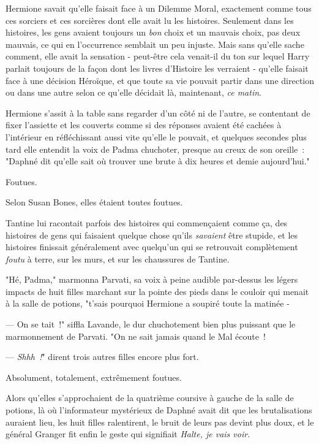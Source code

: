 Hermione savait qu'elle faisait face à un Dilemme Moral, exactement comme tous ces sorciers et ces sorcières dont elle avait lu les histoires. Seulement dans les histoires, les gens avaient toujours un \emph{bon} choix et un mauvais choix, pas deux mauvais, ce qui en l'occurrence semblait un peu injuste. Mais sans qu'elle sache comment, elle avait la sensation - peut-être cela venait-il du ton sur lequel Harry parlait toujours de la façon dont les livres d'Histoire les verraient - qu'elle faisait face à une décision Héroïque, et que toute sa vie pouvait partir dans une direction ou dans une autre selon ce qu'elle décidait là, maintenant, \emph{ce matin}.

Hermione s'assit à la table sans regarder d'un côté ni de l'autre, se contentant de fixer l'assiette et les couverts comme si des réponses avaient été cachées à l'intérieur en réfléchissant aussi vite qu'elle le pouvait, et quelques secondes plus tard elle entendit la voix de Padma chuchoter, presque au creux de son oreille~: "Daphné dit qu'elle sait où trouver une brute à dix heures et demie aujourd'hui."

\later

Foutues.

Selon Susan Bones, elles étaient toutes foutues.

Tantine lui racontait parfois des histoires qui commençaient comme ça, des histoires de gens qui faisaient quelque chose qu'ils \emph{savaient} être stupide, et les histoires finissait généralement avec quelqu'un qui se retrouvait complètement \emph{foutu} à terre, sur les murs, et sur les chaussures de Tantine.

"Hé, Padma," marmonna Parvati, sa voix à peine audible par-dessus les légers impacts de huit filles marchant sur la pointe des pieds dans le couloir qui menait à la salle de potions, "t'sais pourquoi Hermione a soupiré toute la matinée -

--- On se tait~!" siffla Lavande, le dur chuchotement bien plus puissant que le marmonnement de Parvati. "On ne sait jamais quand le Mal écoute~!

--- \emph{Shhh~!}" dirent trois autres filles encore plus fort.

Absolument, totalement, extrêmement foutues.

Alors qu'elles s'approchaient de la quatrième coursive à gauche de la salle de potions, là où l'informateur mystérieux de Daphné avait dit que les brutalisations auraient lieu, les huit filles ralentirent, le bruit de leurs pas devint plus doux, et le général Granger fit enfin le geste qui signifiait \emph{Halte, je vais voir}.

